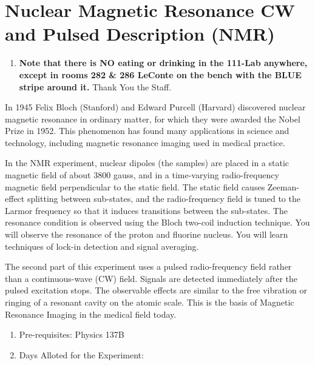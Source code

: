 \documentclass{../lab}
\begin{document}
\maketitle

\tableofcontents

\section{Nuclear Magnetic Resonance CW and Pulsed Description (NMR)}

\begin{enumerate}
    \item \textbf{Note that there is NO eating or drinking in the 111-Lab anywhere, except in rooms 282 \& 286 LeConte on the bench with the BLUE stripe around it.} Thank You the Staff.

\end{enumerate}

In 1945 Felix Bloch (Stanford) and Edward Purcell (Harvard) discovered nuclear magnetic resonance in ordinary matter, for which they were awarded the Nobel Prize in 1952. This phenomenon has found many applications in science and technology, including magnetic resonance imaging used in medical practice.

In the NMR experiment, nuclear dipoles (the samples) are placed in a static magnetic field of about 3800 gauss, and in a time-varying radio-frequency magnetic field perpendicular to the static field. The static field causes Zeeman-effect splitting between sub-states, and the radio-frequency field is tuned to the Larmor frequency so that it induces transitions between the sub-states. The resonance condition is observed using the Bloch two-coil induction technique. You will observe the resonance of the proton and fluorine nucleus. You will learn techniques of lock-in detection and signal averaging.

The second part of this experiment uses a pulsed radio-frequency field rather than a continuous-wave (CW) field. Signals are detected immediately after the pulsed excitation stops. The observable effects are similar to the free vibration or ringing of a resonant cavity on the atomic scale. This is the basis of Magnetic Resonance Imaging in the medical field today.

\begin{enumerate}
    \item Pre-requisites: Physics 137B

    \item Days Alloted for the Experiment:

\end{enumerate}
\end{document}
